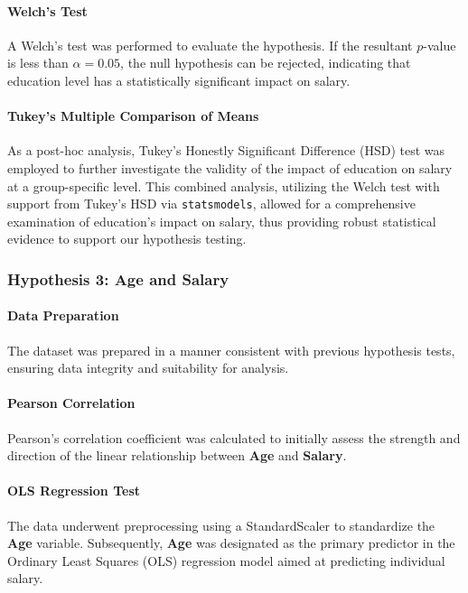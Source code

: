 \paragraph{Welch's Test}
A Welch's test was performed to evaluate the hypothesis. If the resultant $p$-value is less than \( \alpha = 0.05 \), the null hypothesis can be rejected, indicating that education level has a statistically significant impact on salary.

\paragraph{Tukey's Multiple Comparison of Means}
As a post-hoc analysis, Tukey's Honestly Significant Difference (HSD) test was employed to further investigate the validity of the impact of education on salary at a group-specific level. This combined analysis, utilizing the Welch test with support from Tukey's HSD via \texttt{statsmodels}, allowed for a comprehensive examination of education's impact on salary, thus providing robust statistical evidence to support our hypothesis testing.

\subsubsection{Hypothesis 3: Age and Salary}

\paragraph{Data Preparation}
The dataset was prepared in a manner consistent with previous hypothesis tests, ensuring data integrity and suitability for analysis.

\paragraph{Pearson Correlation}
Pearson's correlation coefficient was calculated to initially assess the strength and direction of the linear relationship between \textbf{Age} and \textbf{Salary}.

\paragraph{OLS Regression Test}
The data underwent preprocessing using a StandardScaler to standardize the \textbf{Age} variable. Subsequently, \textbf{Age} was designated as the primary predictor in the Ordinary Least Squares (OLS) regression model aimed at predicting individual salary.

